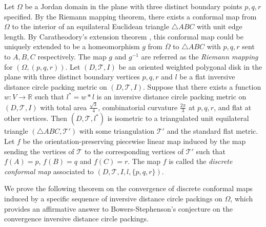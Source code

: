 \documentclass[12pt]{amsart}
\begin{document}
Let $\Omega$ be a Jordan domain in the plane with three distinct boundary points $p,q,r$ specified. By the Riemann mapping theorem,
there exists a conformal map from $\Omega$ to the interior of an equilateral Euclidean triangle $\triangle ABC$ with unit edge length.
By Caratheodory's extension theorem \cite{P book},
this conformal map could be uniquely extended to be a homeomorphism $g$
from $\overline{\Omega}$ to $\triangle ABC$ with $p,q,r$ sent to $A, B,C$ respectively.
The map $g$ and $g^{-1}$ are referred as the \textit{Riemann mapping} for $(\Omega, (p,q,r))$.
Let $(D,\mathcal{T}, I)$ be an oriented weighted polygonal disk in the plane with three distinct boundary vertices $p,q,r$ and
$l$ be a flat inversive distance circle packing metric on $(D,\mathcal{T}, I)$.
Suppose that there exists a function $w: V\rightarrow \mathbb{R}$ such that $l^*=w*l$ is an inversive distance circle packing metric
on $(D,\mathcal{T}, I)$ with total area $\frac{\sqrt{3}}{4}$, combinatorial curvature $\frac{2\pi}{3}$ at $p,q,r$, and flat at other vertices.
Then $(D,\mathcal{T}, l^*)$ is isometric to
a triangulated unit equilateral triangle $(\triangle ABC, \mathcal{T}')$ with some triangulation $\mathcal{T}'$ and
the standard flat metric.
Let $f$ be the orientation-preserving piecewise linear map induced by the map sending the vertices of $\mathcal{T}$ to the corresponding vertices of $\mathcal{T}'$ such that $f(A) = p$, $f(B) = q$ and $f(C) = r$. The map
$f$ is called the \textit{discrete conformal map} associated to $(D,\mathcal{T}, I, l, \{p,q,r\})$.

We prove the following theorem on the convergence of discrete conformal maps induced by a specific sequence of inversive distance circle packings on $\Omega$, which provides an affirmative answer to Bowers-Stephenson's conjecture on the convergence inversive distance circle packings.
\end{document}

